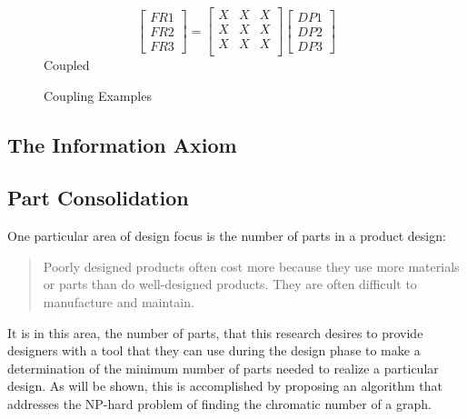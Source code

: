\begin{figure}
{\begin{minipage}{3in}
\begin{center}
        \[\begin{bmatrix}
        FR1 \\ FR2 \\ FR3
        \end{bmatrix}=\begin{bmatrix}
        X & X & X \\
        X & X & X \\
        X & X & X \\
        \end{bmatrix}\begin{bmatrix}
          DP1 \\ DP2 \\ DP3
        \end{bmatrix}\]
        Coupled
      \end{center}
    \end{minipage}
  }
  \caption{Coupling Examples}
\end{figure}

\subsection{The Information Axiom}

\subsection{Part Consolidation}

One particular area of design focus is the number of parts in a product design:
\begin{quote}
  Poorly designed products often cost more because they use more materials or parts than do well-designed products.
  They are often difficult to manufacture and maintain.
\end{quote}
It is in this area, the number of parts, that this research desires to provide designers with a tool that they can
use during the design phase to make a determination of the minimum number of parts needed to realize a particular
design.  As will be shown, this is accomplished by proposing an algorithm that addresses the NP-hard problem of
finding the chromatic number of a graph.
